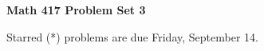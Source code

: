 \documentclass[12pt]{article}
\begin{document}
\def\ctln{\centerline}
\def\msk{\medskip}
\def\bsk{\bigskip}
\def\ssk{\smallskip}
\def\hsk{\hskip.3in}
\def\ra{\rightarrow}
\def\ubr{\underbar}

\def\mt{{\mathcal T}}
\def\mb{{\mathcal B}}
\def\ms{{\mathcal S}}
\def\mu{{\mathcal U}}
\def\mv{{\mathcal V}}

\def\bbr{{\mathbb R}}
\def\bbz{{\mathbb Z}}
\def\spc{$~$\hskip.15in$~$}

\def\sset{\subseteq}
\def\del{\partial}
\def\lra{$\Leftrightarrow$}
\def\bra{$\Rightarrow$}




\ctln{\bf Math 417 Problem Set 3}

\msk

Starred (*) problems are due Friday, September 14.
\end{document}

